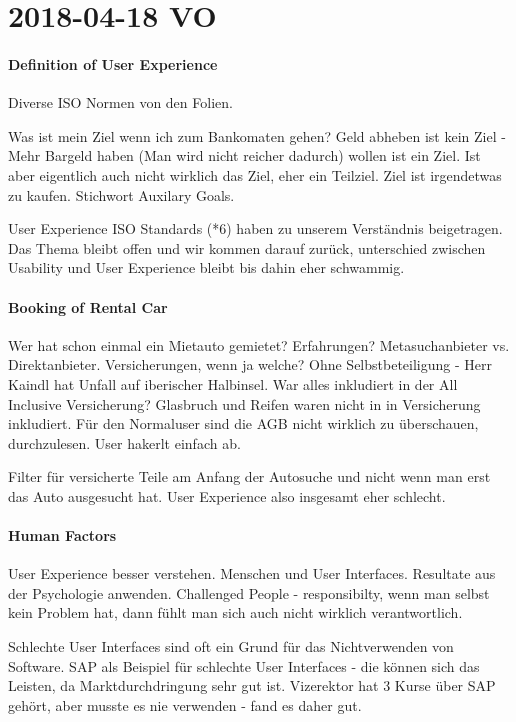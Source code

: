 \section{2018-04-18 VO}
\paragraph{Definition of User Experience}

Diverse ISO Normen von den Folien.

Was ist mein Ziel wenn ich zum Bankomaten gehen?
Geld abheben ist kein Ziel - Mehr Bargeld haben (Man wird nicht reicher dadurch)
wollen ist ein Ziel. Ist aber eigentlich auch nicht wirklich das Ziel, eher ein
Teilziel. Ziel ist irgendetwas zu kaufen. Stichwort Auxilary Goals.

User Experience ISO Standards (*6) haben zu unserem Verständnis beigetragen.
Das Thema bleibt offen und wir kommen darauf zurück, unterschied zwischen
Usability und User Experience bleibt bis dahin eher schwammig.

\paragraph{Booking of Rental Car}
Wer hat schon einmal ein Mietauto gemietet? Erfahrungen? Metasuchanbieter vs.
Direktanbieter.
Versicherungen, wenn ja welche? Ohne Selbstbeteiligung - Herr Kaindl hat Unfall
auf iberischer Halbinsel. 
War alles inkludiert in der All Inclusive Versicherung? Glasbruch und Reifen
waren nicht in in Versicherung inkludiert. Für den Normaluser sind die AGB
nicht wirklich zu überschauen, durchzulesen. User hakerlt einfach ab.

Filter für versicherte Teile am Anfang der Autosuche und nicht wenn man erst 
das Auto ausgesucht hat. User Experience also insgesamt eher schlecht.

\paragraph{Human Factors}
User Experience besser verstehen. Menschen und User Interfaces. Resultate
aus der Psychologie anwenden. 
Challenged People - responsibilty, wenn man selbst kein Problem hat, dann fühlt
man sich auch nicht wirklich verantwortlich.

Schlechte User Interfaces sind oft ein Grund für das Nichtverwenden von Software.
SAP als Beispiel für schlechte User Interfaces - die können sich das Leisten,
da Marktdurchdringung sehr gut ist. Vizerektor hat 3 Kurse über SAP gehört, aber
musste es nie verwenden - fand es daher gut.

